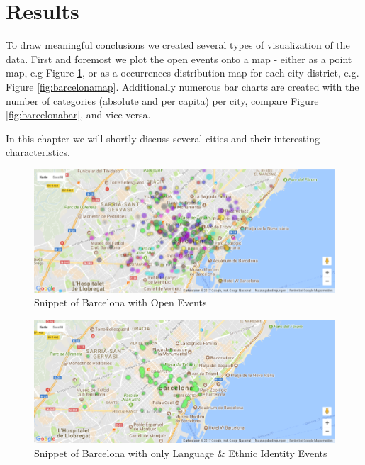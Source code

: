\section{Results}\label{sec:results}

To draw meaningful conclusions we created several types of visualization of the data. First and foremost we plot the open events onto a map - either as a point map, e.g Figure \ref{fig:barcelonapoints}, or as a occurrences distribution map for each city district, e.g. Figure \ref{fig:barcelonamap}. Additionally numerous bar charts are created with the number of categories (absolute and per capita) per city, compare Figure \ref{fig:barcelonabar}, and vice versa. 

In this chapter we will shortly discuss several cities and their interesting characteristics. 

\begin{figure}[!htp]
	\includegraphics[width=1\linewidth]{images/Barcelona_points.png}
	\caption{Snippet of Barcelona with Open Events}\label{fig:barcelonapoints}	
\end{figure}

\begin{figure}[!htp]
	\includegraphics[width=1\linewidth]{images/Barcelona_points_Language.png}
	\caption{Snippet of Barcelona with only Language \& Ethnic Identity Events}\label{fig:barcelonapointslanguage}	
\end{figure}

